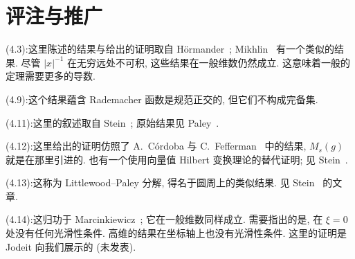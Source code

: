 \section{评注与推广}
\label{sec:4.3}

\noindent (4.3):\quad 这里陈述的结果与给出的证明取自 H\"ormander~\cite{hormander}; Mikhlin~\cite{mikhlin} 有一个类似的结果. 尽管 $|x|^{-1}$ 在无穷远处不可积, 这些结果在一般维数仍然成立. 这意味着一般的定理需要更多的导数.

\noindent (4.9):\quad 这个结果蕴含 Rademacher 函数是规范正交的, 但它们不构成完备集.

\noindent (4.11):\quad 这里的叙述取自 Stein~\cite{stein-singular}; 原始结果见 Paley~\cite{paley}.

\noindent (4.12):\quad 这里给出的证明仿照了 A.~C\'ordoba 与 C.~Fefferman~\cite{cordoba-feffermanC-weighted} 中的结果, $M_{s}(g)$ 就是在那里引进的. 也有一个使用向量值 Hilbert 变换理论的替代证明; 见 Stein~\cite{stein-singular}.

\noindent (4.13):\quad 这称为 Littlewood--Paley 分解, 得名于圆周上的类似结果. 见 Stein~\cite{stein-square} 的文章.

\noindent (4.14):\quad 这归功于 Marcinkiewicz~\cite{marcinkiewicz-interpolation}; 它在一般维数同样成立. 需要指出的是, 在 $\xi=0$ 处没有任何光滑性条件. 高维的结果在坐标轴上也没有光滑性条件. 这里的证明是 Jodeit 向我们展示的 (未发表).
